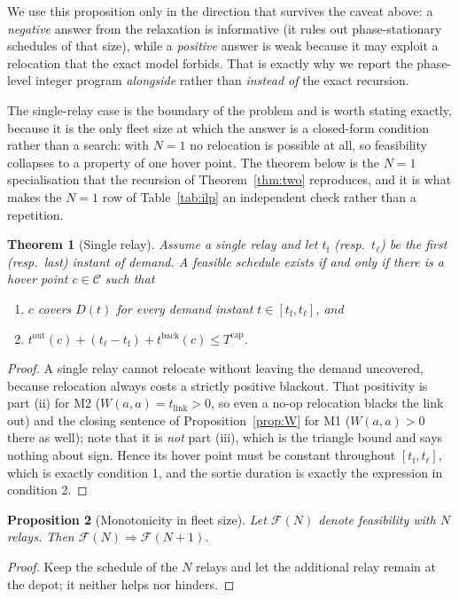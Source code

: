\documentclass[11pt]{article}
\theoremstyle{dshplain}
\newtheorem{theorem}{Theorem}
\newtheorem{proposition}[theorem]{Proposition}
\theoremstyle{dshdefn}
\begin{document}
\noindent We use this proposition only in the direction that survives the caveat
above: a \emph{negative} answer from the relaxation is informative (it rules out
phase-stationary schedules of that size), while a \emph{positive} answer is weak
because it may exploit a relocation that the exact model forbids. That is exactly
why we report the phase-level integer program \emph{alongside} rather than
\emph{instead of} the exact recursion.

\noindent The single-relay case is the boundary of the problem and is worth
stating exactly, because it is the only fleet size at which the answer is a
closed-form condition rather than a search: with $N=1$ no relocation is possible
at all, so feasibility collapses to a property of one hover point. The theorem
below is the $N=1$ specialisation that the recursion of
Theorem~\ref{thm:two} reproduces, and it is what makes the $N=1$ row of
Table~\ref{tab:ilp} an independent check rather than a repetition.

\begin{theorem}[Single relay]
\label{thm:one}
Assume a single relay and let $t_{\mathrm{f}}$ (resp.\ $t_{\ell}$) be the first
(resp.\ last) instant of demand. A feasible schedule exists if and only if there
is a hover point $c\in\mathcal{C}$ such that
\begin{enumerate}[leftmargin=1.6em,itemsep=2pt]
\item $c$ covers $D(t)$ for every demand instant $t\in[t_{\mathrm{f}},t_{\ell}]$, and
\item $t^{\mathrm{out}}(c)+(t_{\ell}-t_{\mathrm{f}})+t^{\mathrm{back}}(c)
 \le T^{\mathrm{cap}}$.
\end{enumerate}
\end{theorem}
\begin{proof}
A single relay cannot relocate without leaving the demand uncovered, because
relocation always costs a strictly positive blackout. That positivity is part
(ii) for M2 ($W(a,a)=t_{\mathrm{link}}>0$, so even a no-op relocation blacks the
link out) and the closing sentence of Proposition~\ref{prop:W} for M1
($W(a,a)>0$ there as well); note that it is \emph{not} part (iii), which is the
triangle bound and says nothing about sign. Hence its hover
point must be constant throughout $[t_{\mathrm{f}},t_{\ell}]$, which is exactly
condition 1, and the sortie duration is exactly the expression in condition 2.
\end{proof}

\begin{proposition}[Monotonicity in fleet size]
\label{prop:monotone}
Let $\mathcal{F}(N)$ denote feasibility with $N$ relays. Then
$\mathcal{F}(N)\Rightarrow\mathcal{F}(N+1)$.
\end{proposition}
\begin{proof}
Keep the schedule of the $N$ relays and let the additional relay remain at the
depot; it neither helps nor hinders.
\end{proof}
\end{document}

